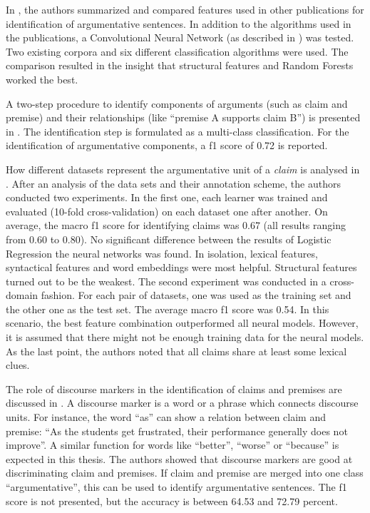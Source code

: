 In \cite{Aker2017What-works-and-}, the authors summarized and compared features used in other publications for identification of argumentative sentences. In addition to the algorithms used in the publications, a Convolutional Neural Network (as described in \cite{Kim2014Convolutional-N}) was tested. Two existing corpora and six different classification algorithms were used. The comparison resulted in the insight that structural features and Random Forests worked the best.

A two-step procedure to identify components of arguments (such as claim and premise) and their relationships (like \enquote{premise A supports claim B}) is presented in \cite{Stab2014Identifying-Arg}. The identification step is formulated as a multi-class classification. For the identification of argumentative components, a f1 score of 0.72 is reported.

How different datasets represent the argumentative unit of a \emph{claim} is analysed in \cite{Daxenberger2017What-is-the-Ess}. After an analysis of the data sets and their annotation scheme, the authors conducted two experiments.
In the first one, each learner was trained and evaluated (10-fold cross-validation) on each dataset one after another. On average, the macro f1 score for identifying claims was 0.67 (all results ranging from 0.60 to 0.80). No significant difference between the results of Logistic Regression the neural networks was found. In isolation, lexical features, syntactical features and word embeddings were most helpful. Structural features turned out to be the weakest.
The second experiment was conducted in a cross-domain fashion. For each pair of datasets, one was used as the training set and the other one as the test set. The average macro f1 score was 0.54. In this scenario, the best feature combination outperformed all neural models. However, it is assumed that there might not be enough training data for the neural models.
As the last point, the authors noted that all claims share at least some lexical clues.


The role of discourse markers in the identification of claims and premises are discussed in \cite{Eckle-Kohler2015On-the-Role-of-}. A discourse marker is a word or a phrase which connects discourse units. For instance, the word \enquote{as} can show a relation between claim and premise: \enquote{As the students get frustrated, their performance generally does not improve}.  A similar function for words like \enquote{better}, \enquote{worse} or \enquote{because} is expected in this thesis. The authors showed that discourse markers are good at discriminating claim and premises. If claim and premise are merged into one class \enquote{argumentative}, this can be used to identify argumentative sentences. The f1 score is not presented, but the accuracy is between 64.53 and 72.79 percent.



